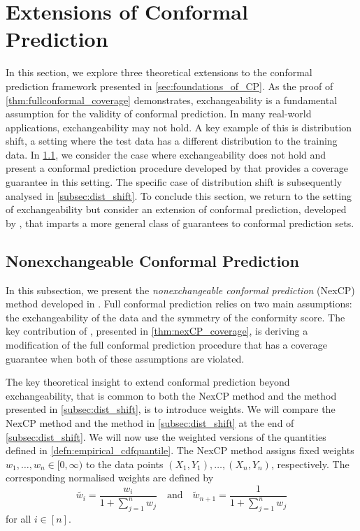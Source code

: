 \documentclass[11pt, titlepage]{article} %
\numberwithin{equation}{section}
\theoremstyle{definition}
\numberwithin{theorem}{section}
\numberwithin{lemma}{section}
\numberwithin{corollary}{section}
\numberwithin{proposition}{section}
\numberwithin{definition}{section}
\numberwithin{remark}{section}
\begin{document}
\section{Extensions of Conformal Prediction}
\label{sec:extensions_of_CP}

In this section, we explore three theoretical extensions to the conformal prediction framework presented in \cref{sec:foundations_of_CP}. As the proof of \cref{thm:fullconformal_coverage} demonstrates, exchangeability is a fundamental assumption for the validity of conformal prediction. In many real-world applications, exchangeability may not hold. A key example of this is distribution shift, a setting where the test data has a different distribution to the training data. In \cref{subsec:nex_CP}, we consider the case where exchangeability does not hold and present a conformal prediction procedure developed by \cite{barber2023conformalbeyondexch} that provides a coverage guarantee in this setting. The specific case of distribution shift is subsequently analysed in \cref{subsec:dist_shift}. To conclude this section, we return to the setting of exchangeability but consider an extension of conformal prediction, developed by \cite{angelopoulos2024riskcontrol}, that imparts a more general class of guarantees to conformal prediction sets.

\subsection{Nonexchangeable Conformal Prediction}
\label{subsec:nex_CP}



In this subsection, we present the \textit{nonexchangeable conformal prediction} (NexCP) method developed in \cite{barber2023conformalbeyondexch}. Full conformal prediction relies on two main assumptions: the exchangeability of the data and the symmetry of the conformity score. The key contribution of \cite{barber2023conformalbeyondexch}, presented in \cref{thm:nexCP_coverage}, is deriving a modification of the full conformal prediction procedure that has a coverage guarantee when both of these assumptions are violated. \vskip5pt

\noindent
The key theoretical insight to extend conformal prediction beyond exchangeability, that is common to both the NexCP method and the method presented in \cref{subsec:dist_shift}, is to introduce weights. We will compare the NexCP method and the method in \cref{subsec:dist_shift} at the end of \cref{subsec:dist_shift}. We will now use the weighted versions of the quantities defined in \cref{defn:empirical_cdfquantile}. The NexCP method assigns fixed weights \(w_1, \ldots, w_{n} \in [0, \infty)\) to the data points \((X_1, Y_1), \ldots, (X_n, Y_n)\), respectively. The corresponding normalised weights are defined by \begin{equation}
    \tilde{w_i} = \frac{w_i}{1+\sum_{j=1}^n w_j} \quad \mathrm{and} \quad \tilde{w}_{n+1} = \frac{1}{1+\sum_{j=1}^n w_j}
\label{eqn:nexCP_weights_defn}
\end{equation} for all \(i \in [n]\). \vskip5pt
\end{document}
